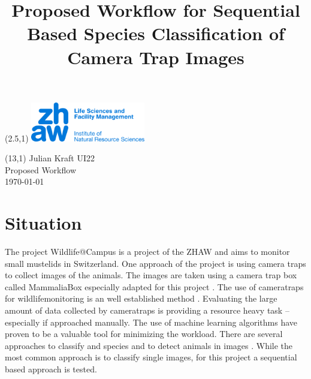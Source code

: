 \documentclass{article}
\title{Proposed Workflow for Sequential Based Species Classification of Camera Trap Images}
\makeatletter
\renewcommand{\maketitle}{
  \begin{flushleft} 
    \Large\textmd{\@title} 
    \par
  \end{flushleft}
}
\makeatother
\begin{document}
\begin{textblock}{5}(2.5,1) %
  \includegraphics[width=5cm]{resources/logo.jpg} %
\end{textblock}

\begin{textblock}{6}(13,1) %
        \raggedleft
        Julian Kraft UI22\\
        Proposed Workflow\\
        \today
\end{textblock}

\vspace*{1.5cm}


\maketitle


\section*{Situation} %

The project Wildlife@Campus is a project of the ZHAW and aims to monitor small mustelids in Switzerland.
One approach of the project is using camera traps to collect images of the animals. 
The images are taken using a camera trap box called MammaliaBox especially adapted for this
project \autocite{grafWildlifeCampusKleineSaeugetiere2022}.
The use of cameratraps for wildlifemonitoring is an well established method 
\autocite{cordierCameraTrapResearch2022, beaudrotStandardizedAssessmentBiodiversity2016}. 
Evaluating the large amount of data collected by cameratraps
is providing a resource heavy task -- especially if approached manually. The use of machine learning algorithms 
have proven to be a valuable tool for minimizing the workload. There are several approaches to classify and species and
to detect animals in images \autocite{tabakMachineLearningClassify2019, bohnerSemiautomaticWorkflowProcess2023}. 
While the most common approach is to classify single images, for this project a sequential based approach is tested.
\end{document}
